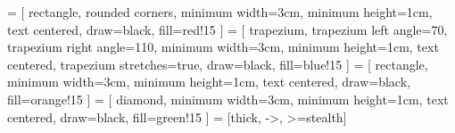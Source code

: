  = [
    rectangle,
    rounded corners,
    minimum width=3cm,
    minimum height=1cm,
    text centered,
    draw=black,
    fill=red!15
]
 = [
    trapezium,
    trapezium left angle=70,
    trapezium right angle=110,
    minimum width=3cm,
    minimum height=1cm,
    text centered,
    trapezium stretches=true,
    draw=black,
    fill=blue!15
]
 = [
    rectangle,
    minimum width=3cm,
    minimum height=1cm,
    text centered,
    draw=black,
    fill=orange!15
]
 = [
    diamond,
    minimum width=3cm,
    minimum height=1cm,
    text centered,
    draw=black,
    fill=green!15
]
 = [thick, ->, >=stealth]
